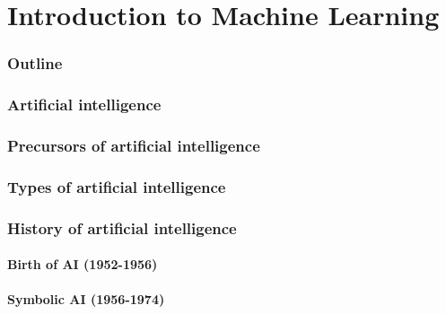 \renewcommand{\thispart}{1 }
\renewcommand{\thispartname}{Introduction to Machine Learning}

\part{\thispartname}



\section{Outline}


\section{Artificial intelligence}


\section{Precursors of artificial intelligence}


\section{Types of artificial intelligence}





\section{History of artificial intelligence}

\subsection{Birth of AI (1952-1956)}







\subsection{Symbolic AI (1956-1974)}
